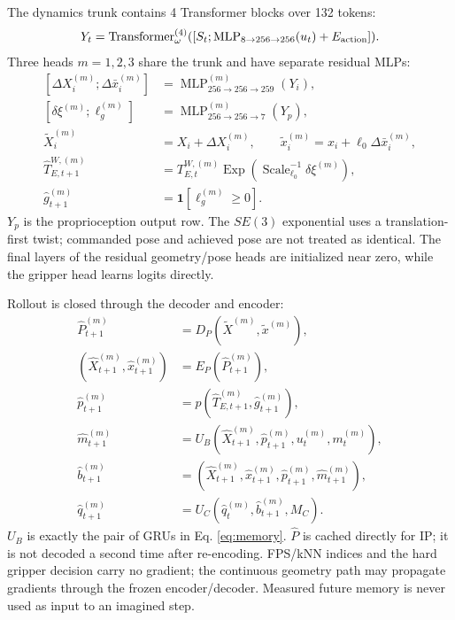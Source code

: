 \documentclass[
  10pt,
]{article}
\begin{document}
The dynamics trunk contains 4 Transformer blocks over 132 tokens:
\begin{equation}\label{eq:wmtrunk}
Y_t=\operatorname{Transformer}^{(4)}_\omega
([S_t;\operatorname{MLP}_{8\to256\to256}(u_t)+E_{\rm action}]).
\end{equation}
Three heads \(m=1,2,3\) share the trunk and have separate residual MLPs:
\begin{equation}\label{eq:wmpredict}
\begin{aligned}
[\Delta X_i^{(m)};\Delta\bar x_i^{(m)}]
 &=\operatorname{MLP}^{(m)}_{256\to256\to259}(Y_i),\\
[\delta\xi^{(m)};\ell_g^{(m)}]
 &=\operatorname{MLP}^{(m)}_{256\to256\to7}(Y_p),\\
\widetilde X_i^{(m)}&=X_i+\Delta X_i^{(m)},\qquad
\widetilde x_i^{(m)}=x_i+\ell_0\Delta\bar x_i^{(m)},\\
\hat T_{E,t+1}^{W,(m)}
 &=T_{E,t}^{W,(m)}\operatorname{Exp}(\operatorname{Scale}^{-1}_{\ell_0}\delta\xi^{(m)}),\\
\hat g_{t+1}^{(m)}&=\mathbf1[\ell_g^{(m)}\geq0].
\end{aligned}
\end{equation}
\(Y_p\) is the proprioception output row. The \(SE(3)\) exponential uses a translation-first twist; commanded pose and achieved pose are not treated as identical. The final layers of the residual geometry/pose heads are initialized near zero, while the gripper head learns logits directly.

Rollout is closed through the decoder and encoder:
\begin{equation}\label{eq:wmrecursive}
\begin{aligned}
\hat P_{t+1}^{(m)}&=D_P(\widetilde X^{(m)},\widetilde x^{(m)}),\\
(\hat X_{t+1}^{(m)},\hat x_{t+1}^{(m)})&=E_P(\hat P_{t+1}^{(m)}),\\
\hat p_{t+1}^{(m)}&=p(\hat T_{E,t+1}^{(m)},\hat g_{t+1}^{(m)}),\\
\hat m_{t+1}^{(m)}&=U_B(\hat X_{t+1}^{(m)},\hat p_{t+1}^{(m)},u_t^{(m)},m_t^{(m)}),\\
\hat b_{t+1}^{(m)}&=(\hat X_{t+1}^{(m)},\hat x_{t+1}^{(m)},\hat p_{t+1}^{(m)},\hat m_{t+1}^{(m)}),\\
\hat q_{t+1}^{(m)}&=U_C(\hat q_t^{(m)},\hat b_{t+1}^{(m)},M_C).
\end{aligned}
\end{equation}
\(U_B\) is exactly the pair of GRUs in Eq. \eqref{eq:memory}. \(\hat P\) is cached directly for IP; it is not decoded a second time after re-encoding. FPS/kNN indices and the hard gripper decision carry no gradient; the continuous geometry path may propagate gradients through the frozen encoder/decoder. Measured future memory is never used as input to an imagined step.
\end{document}
